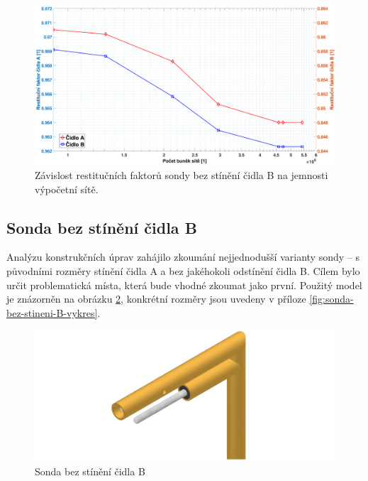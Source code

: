         \begin{figure}[ht!]
            \centering
            \includegraphics*[width=\textwidth, trim={3.9cm 1.0cm 2.7cm 2.0cm}]{400_SIMULACE_KONSTRUKCNICH_UPRAV/Grafy/citlivost_site.eps}
            \caption{Závislost restitučních faktorů sondy bez stínění čidla B na jemnosti výpočetní sítě.}
            \label{fig:citlivost-site}
        \end{figure}
    \newpage
    \subsection{Sonda bez stínění čidla B} \label{sec:sonda-bez-stineni-B}
        Analýzu konstrukčních úprav zahájilo zkoumání nejjednodušší varianty sondy – s původními rozměry stínění čidla A a bez jakéhokoli odstínění čidla B. Cílem bylo určit problematická místa, která bude vhodné zkoumat jako první. Použitý model je znázorněn na obrázku \ref{fig:sonda-bez-stineni-B}, konkrétní rozměry jsou uvedeny v příloze \ref{fig:sonda-bez-stineni-B-vykres}. 

        \begin{figure}[ht!]
            \centering
            \includegraphics[width=\textwidth]{400_SIMULACE_KONSTRUKCNICH_UPRAV/Vykresy_rendery/Sonda_bez_stineni_B.png}
            \caption{Sonda bez stínění čidla B}
            \label{fig:sonda-bez-stineni-B}
        \end{figure}
        
